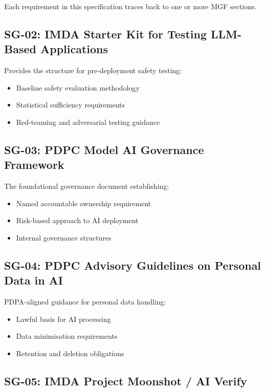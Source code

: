 Each requirement in this specification traces back to one or more MGF sections.

\subsection{SG-02: IMDA Starter Kit for Testing LLM-Based Applications}

Provides the structure for pre-deployment safety testing:

\begin{itemize}
  \item Baseline safety evaluation methodology
  \item Statistical sufficiency requirements
  \item Red-teaming and adversarial testing guidance
\end{itemize}

\subsection{SG-03: PDPC Model AI Governance Framework}

The foundational governance document establishing:

\begin{itemize}
  \item Named accountable ownership requirement
  \item Risk-based approach to AI deployment
  \item Internal governance structures
\end{itemize}

\subsection{SG-04: PDPC Advisory Guidelines on Personal Data in AI}

PDPA-aligned guidance for personal data handling:

\begin{itemize}
  \item Lawful basis for AI processing
  \item Data minimisation requirements
  \item Retention and deletion obligations
\end{itemize}

\subsection{SG-05: IMDA Project Moonshot / AI Verify}

